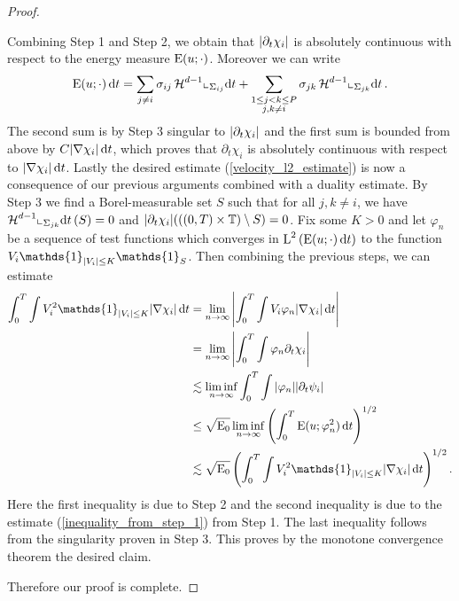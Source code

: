 \begin{proof}
\begin{description}[wide=0pt]
		Combining Step 1 and Step 2, we obtain that $ \abs{ \partial_{ t } 
		\chi_{ i } } $ is absolutely continuous with respect to the energy 
		measure $ \operatorname{E} ( u ; \cdot ) $. Moreover we can write
		\begin{equation*}
			\operatorname{E} ( u ; \cdot ) \dd{ t }
			=
			\sum_{ j \neq i }
			\sigma_{ i j }
			\operatorname{\mathcal{H}}^{ d - 1 } \llcorner_{ \Sigma_{ i j } }
			\dd{ t }
			+
			\sum_{ \substack{1 \leq j < k \leq P \\ j, k \neq i } }
			\sigma_{ j k }
			\operatorname{\mathcal{H}}^{ d- 1 } \llcorner_{ \Sigma_{ j k } }
			\dd{ t }.
		\end{equation*}
		The second sum is by Step 3 singular to $ \abs{ 
		\partial_{ t } \chi_{ i } } $ and the first sum is bounded from above 
		by 
		$ C\abs{ \nabla \chi_{ i } } \dd{ t } $, which proves that $ \partial_{ 
		t 
		} \chi_{ i } $ is absolutely continuous with respect to $ \abs{ \nabla 
		\chi_{ i } } \dd{ t } $.
		Lastly the desired estimate (\ref{velocity_l2_estimate}) is now a 
		consequence of our 
		previous arguments combined with a duality estimate. By Step 3 we find 
		a Borel-measurable set $ S $ such that for all $ j, k \neq i $, we have 
		$ \operatorname{\mathcal{H}}^{ d-  1 } \llcorner_{ \Sigma_{ j k } } \dd{ t } ( S ) = 0 $ and $ 
		\abs{ 
		\partial_{ t } \chi_{ i } } ( \left( ( 0 , T ) \times \operatorname{\mathbb{T}} 
		\right) \setminus S ) 
		= 0 $. Fix some $ K > 0 $ 
		and let $ \varphi_{ n } $ be a sequence of test functions which 
		converges in 
		$ \operatorname{L}^{ 2 } \left( \operatorname{E} ( u ; \cdot ) \dd{ t } \right) $ to the 
		function
		$ V_{ i } \mathds{ 1 }_{ \abs{ V_{ i } } \leq K } \mathds{ 1 }_{ 
		S } $. Then combining the 
		previous steps, we can estimate
		\begin{align*}
			\int_{ 0 }^{ T }
			\int
			V_{ i }^{ 2 } \mathds{ 1 }_{ \abs{ V_{ i } } \leq K }
			\abs{ \nabla \chi_{ i } }
			\dd{ t }
			& =
			\lim_{ n \to \infty }
			\abs{
				\int_{ 0 }^{ T }
				\int
				V_{ i } \varphi_{ n } 
				\abs{ \nabla \chi_{ i } }
				\dd{ t }
			}
			\\
			& = 
			\lim_{ n \to \infty }
			\abs{
				\int_{ 0 }^{ T }
				\int
				\varphi_{ n } \partial_{ t } \chi_{ i }
			}
			\\
			& \lesssim
			\liminf_{ n \to \infty }
			\int_{ 0 }^{ T }
			\int
			\abs{ \varphi_{ n } }
			\abs{ \partial_{ t } \psi_{ i } }
			\\
			& \leq
			\sqrt{ \energy_{ 0 } }
			\liminf_{ n \to \infty }
			\left(
			\int_{ 0 }^{ T }
			\energy ( u ; \varphi_{ n }^{ 2 } )
			\dd{ t }
			\right)^{ 1/2 }
			\\
			& \lesssim
			\sqrt{ \energy_{ 0 } }
			\left(
			\int_{ 0 }^{ T }
			\int
			V_{ i }^{ 2 }
			\mathds{ 1 }_{ \abs{ V_{ i } } \leq K }
			\abs{ \nabla \chi_{ i } }
			\dd{ t }
			\right)^{ 1 / 2 }.
		\end{align*}
		Here the first inequality is due to Step 2 and the second inequality is
		due to the estimate (\ref{inequality_from_step_1}) from Step 1.
		The last inequality follows from the singularity proven in Step 3.
		This proves by the monotone convergence theorem the desired claim.
	\end{description} 
	Therefore our proof is complete.
\end{proof}

